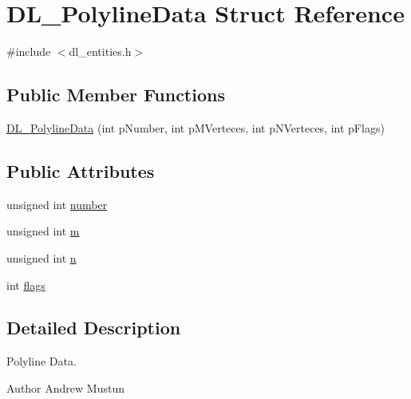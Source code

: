\hypertarget{structDL__PolylineData}{\section{D\-L\-\_\-\-Polyline\-Data Struct Reference}
\label{structDL__PolylineData}
}


{\ttfamily \#include $<$dl\-\_\-entities.\-h$>$}

\subsection*{Public Member Functions}
\begin{DoxyCompactItemize}
\item 
\hyperlink{structDL__PolylineData_a26d96e5e0f1ac6e01ab0aa753dac1d14}{D\-L\-\_\-\-Polyline\-Data} (int p\-Number, int p\-M\-Verteces, int p\-N\-Verteces, int p\-Flags)
\end{DoxyCompactItemize}
\subsection*{Public Attributes}
\begin{DoxyCompactItemize}
\item 
unsigned int \hyperlink{structDL__PolylineData_a20bcf0ca806c2fa8b8e1f96f6d0c36ee}{number}
\item 
unsigned int \hyperlink{structDL__PolylineData_a59523f90d2e8fede866879e596323208}{m}
\item 
unsigned int \hyperlink{structDL__PolylineData_a60a2b0e033690202cf9faec4a4a4afed}{n}
\item 
int \hyperlink{structDL__PolylineData_ab96f90f41192bf3345cf2f84c32d293f}{flags}
\end{DoxyCompactItemize}


\subsection{Detailed Description}
Polyline Data.

\begin{DoxyAuthor}{Author}
Andrew Mustun 
\end{DoxyAuthor}


